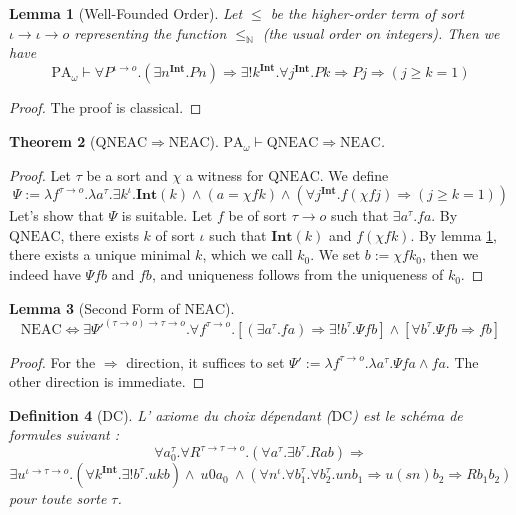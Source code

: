 \documentclass[a4paper,12pt]{article}
\newtheorem{theo}{Theorem}[subsection]
\newtheorem{defi}[theo]{Definition}
\newtheorem{lem}[theo]{Lemma}
\theoremstyle{rmqstyle}
\newcommand{\N}{\mathbb{N}}
\newcommand{\PA}{\mathrm{PA}}
\renewcommand{\int}{\mathbf{Int}}
\renewcommand{\implies}{\Rightarrow}
\renewcommand{\iff}{\Leftrightarrow}
\newcommand{\QNEAC}{\mathrm{QNEAC}}
\newcommand{\NEAC}{\mathrm{NEAC}}
\newcommand{\DC}{\mathrm{DC}}
\begin{document}
\begin{lem}[Well-Founded Order]
\label{ordre bf}
Let $\leq$ be the higher-order term of sort $\iota \to \iota \to o$ representing the function $\leq_\N$ (the usual order on integers). Then we have
$$\PA_\omega \vdash \forall P^{\iota \to o}. (\exists n^\int. Pn) \implies \exists ! k^\int. \forall j^\int. Pk \implies Pj \implies (j \geq k = 1)$$
\end{lem}

\begin{proof}
The proof is classical.
\end{proof}

\begin{theo}[$\QNEAC \implies \NEAC$]
$\PA_\omega \vdash \QNEAC \implies \NEAC$.
\end{theo}

\begin{proof}
Let $\tau$ be a sort and $\chi$ a witness for $\QNEAC$. We define
$$\Psi := \lambda f^{\tau \to o}. \lambda a^\tau. \exists k^\iota. \int(k) \land (a = \chi f k) \land (\forall j^\int. f( \chi f j ) \implies (j \geq k = 1))$$
Let's show that $\Psi$ is suitable. Let $f$ be of sort $\tau \to o$ such that $\exists a^\tau. fa$. By $\QNEAC$, there exists $k$ of sort $\iota$ such that $\int(k)$ and $f( \chi f k)$. By lemma \ref{ordre bf}, there exists a unique minimal $k$, which we call $k_0$. We set $b := \chi f k_0$, then we indeed have $\Psi f b$ and $f b$, and uniqueness follows from the uniqueness of $k_0$.
\end{proof}

\begin{lem}[Second Form of $\NEAC$]
\label{NEAC 2}
$$\NEAC \iff \exists \Psi'^{(\tau \to o) \to \tau \to o}. \forall f^{\tau \to o}.[( \exists a^\tau. fa) \implies \exists ! b^\tau.\Psi f b] \land [\forall b^\tau. \Psi f b \implies fb]$$
\end{lem}

\begin{proof}
For the $\implies$ direction, it suffices to set $\Psi' := \lambda f^{\tau \to o}. \lambda a^\tau. \Psi f a \land fa$. The other direction is immediate.
\end{proof}


\begin{defi}[$\DC$]
L' axiome du choix dépendant ($\DC$) est le schéma de formules suivant :
$$\forall a_0^\tau. \forall R^{\tau \to \tau \to o}. (\forall a^\tau. \exists b^\tau. R a b) \implies$$
$$ \exists u^{\iota \to \tau \to o}.  (\forall k^\int. \exists ! b^\tau. ukb)  \land  \ u 0 a_0 \ \land (\forall n^\iota. \forall b_1^\tau. \forall b_2^\tau. u n b_1 \implies u (sn) b_2 \implies R b_1 b_2)$$
pour toute sorte $\tau$. 
\end{defi}
\end{document}
